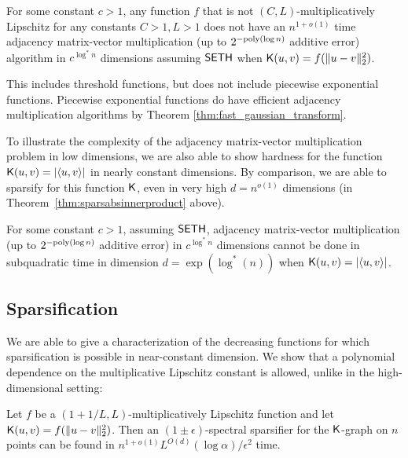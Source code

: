 \begin{theorem}
For some constant $c>1$, any function $f$ that is not $(C,L)$-multiplicatively Lipschitz for any constants $C > 1, L > 1$  does not have an $n^{1+o(1)}$ time adjacency matrix-vector multiplication (up to $2^{-\mathrm{poly}(\log n)}$ additive error) algorithm in $c^{\log^* n}$ dimensions assuming $\mathsf{SETH}$ when $\mathsf{K}(u,v) = f(\| u - v \|_2^2)$.
\end{theorem}

This includes threshold functions, but does not include piecewise exponential functions. Piecewise exponential functions do have efficient adjacency multiplication algorithms by Theorem \ref{thm:fast_gaussian_transform}.

To illustrate the complexity of the adjacency matrix-vector multiplication problem in low dimensions, we are also able to show hardness for the function $\mathsf{K}(u,v) = |\langle u,v\rangle|$ in nearly constant dimensions. By comparison, we are able to sparsify for this function $\mathsf{K}$, even in very high $d = n^{o(1)}$ dimensions (in Theorem~\ref{thm:sparsabsinnerproduct} above).
\begin{theorem} \label{thm:introlowdimmultabsinnerproduct}
For some constant $c>1$, assuming $\mathsf{SETH}$, adjacency matrix-vector multiplication (up to $2^{-\mathrm{poly}(\log n)}$ additive error) in $c^{\log^* n}$ dimensions cannot be done in subquadratic time in dimension $d = \exp(\log^*(n))$ when $\mathsf{K}(u,v) = |\langle u,v\rangle|$.
\end{theorem}


\subsection{Sparsification}

We are able to give a characterization of the decreasing functions for which sparsification is possible in near-constant dimension. We show that a polynomial dependence on the multiplicative Lipschitz constant is allowed, unlike in the high-dimensional setting:
\begin{theorem}\label{thm:informal-low-sparsify-lipschitz}
Let $f$ be a $(1 + 1/L,L)$-multiplicatively Lipschitz function and let $\mathsf{K}(u,v) = f(\|u-v\|_2^2)$. Then an $(1\pm\epsilon)$-spectral sparsifier for the $\mathsf{K}$-graph on $n$ points can be found in $ n^{1+o(1)} L^{O(d)} (\log \alpha) /\epsilon^2$ time. 
\end{theorem}


